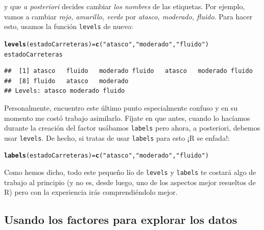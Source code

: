 \documentclass[10pt,a4paper]{article}\usepackage[]{graphicx}\usepackage[]{color}
\makeatletter
\newcommand{\hlstr}[1]{\textcolor[rgb]{0.192,0.494,0.8}{#1}}%
\newcommand{\hlstd}[1]{\textcolor[rgb]{0.345,0.345,0.345}{#1}}%
\newcommand{\hlkwb}[1]{\textcolor[rgb]{0.69,0.353,0.396}{#1}}%
\newcommand{\hlkwd}[1]{\textcolor[rgb]{0.737,0.353,0.396}{\textbf{#1}}}%
\newenvironment{kframe}{%
 \def\at@end@of@kframe{}%
 \ifinner\ifhmode%
  \def\at@end@of@kframe{\end{minipage}}%
  \begin{minipage}{\columnwidth}%
 \fi\fi%
 \def\FrameCommand##1{\hskip\@totalleftmargin \hskip-\fboxsep
 \colorbox{shadecolor}{##1}\hskip-\fboxsep
     \hskip-\linewidth \hskip-\@totalleftmargin \hskip\columnwidth}%
 \MakeFramed {\advance\hsize-\width
   \@totalleftmargin\z@ \linewidth\hsize
   \@setminipage}}%
 {\par\unskip\endMakeFramed%
 \at@end@of@kframe}
\newenvironment{knitrout}{}{} %
\newcounter {cont01}
\makeatother
\begin{document}
y que {\em a posteriori} decides cambiar {\em los nombres} de las etiquetas. Por ejemplo, vamos a cambiar
{\em rojo, amarillo, verde} por {\em atasco, moderado, fluido}. Para hacer esto, usamos la función {\tt levels} de nuevo:
\begin{knitrout}
\color{fgcolor}\begin{kframe}
\begin{alltt}
\hlkwd{levels}\hlstd{(estadoCarreteras)} \hlkwb{=} \hlkwd{c}\hlstd{(}\hlstr{"atasco"}\hlstd{,} \hlstr{"moderado"}\hlstd{,} \hlstr{"fluido"}\hlstd{)}
\hlstd{estadoCarreteras}
\end{alltt}
\begin{verbatim}
##  [1] atasco   fluido   moderado fluido   atasco   moderado fluido  
##  [8] fluido   atasco   moderado
## Levels: atasco moderado fluido
\end{verbatim}
\end{kframe}
\end{knitrout}
Personalmente, encuentro este último punto especialmente confuso y en su momento me costó trabajo asimilarlo. Fíjate en que antes, cuando lo hacíamos durante la creación del factor usábamos {\tt labels} pero ahora, a posteriori, debemos usar {\tt levels}. De hecho, si tratas de usar {\tt labels} para esto ¡R se enfada!:
\begin{knitrout}
\color{fgcolor}\begin{kframe}
\begin{alltt}
\hlkwd{labels}\hlstd{(estadoCarreteras)} \hlkwb{=} \hlkwd{c}\hlstd{(}\hlstr{"atasco"}\hlstd{,} \hlstr{"moderado"}\hlstd{,} \hlstr{"fluido"}\hlstd{)}
\end{alltt}


{\ttfamily\noindent\bfseries{}}\end{kframe}
\end{knitrout}
Como hemos dicho, todo este pequeño lío de {\tt levels} y {\tt labels} te costará algo de trabajo al principio (y no es, desde luego, uno de los aspectos mejor resueltos de R) pero con la experiencia irás comprendiéndolo mejor.


\subsection{Usando los factores para explorar los datos}
\label{tut08:sec:UsandoFactoresExplorarDatos}
\end{document}

